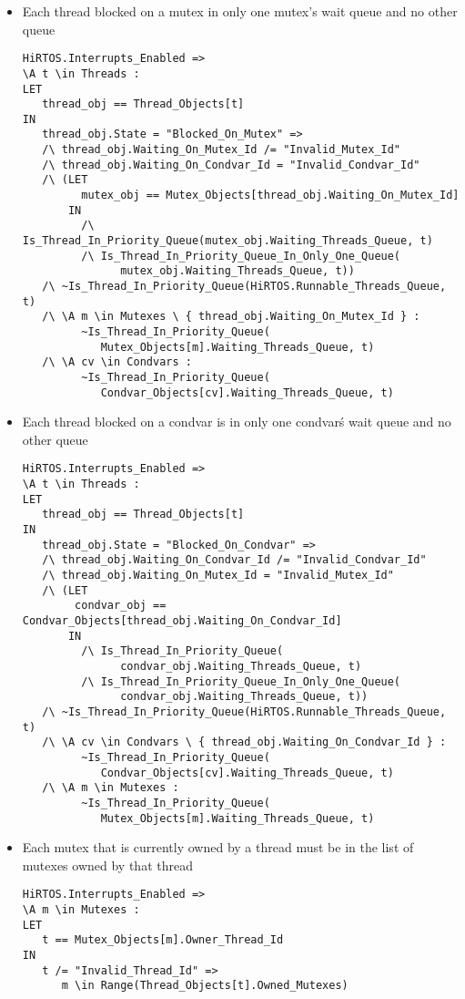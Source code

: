 \documentclass[11pt,letterpaper,twoside,openany]{book}
\begin{document}
\begin{itemize}
\item Each thread blocked on a mutex in only one mutex's wait queue and no other queue
\begin{lstlisting}
HiRTOS.Interrupts_Enabled =>
\A t \in Threads :
LET
   thread_obj == Thread_Objects[t]
IN
   thread_obj.State = "Blocked_On_Mutex" =>
   /\ thread_obj.Waiting_On_Mutex_Id /= "Invalid_Mutex_Id"
   /\ thread_obj.Waiting_On_Condvar_Id = "Invalid_Condvar_Id"
   /\ (LET
         mutex_obj == Mutex_Objects[thread_obj.Waiting_On_Mutex_Id]
       IN
         /\ Is_Thread_In_Priority_Queue(mutex_obj.Waiting_Threads_Queue, t)
         /\ Is_Thread_In_Priority_Queue_In_Only_One_Queue(
               mutex_obj.Waiting_Threads_Queue, t))
   /\ ~Is_Thread_In_Priority_Queue(HiRTOS.Runnable_Threads_Queue, t)
   /\ \A m \in Mutexes \ { thread_obj.Waiting_On_Mutex_Id } :
         ~Is_Thread_In_Priority_Queue(
            Mutex_Objects[m].Waiting_Threads_Queue, t)
   /\ \A cv \in Condvars :
         ~Is_Thread_In_Priority_Queue(
            Condvar_Objects[cv].Waiting_Threads_Queue, t)
\end{lstlisting}

\item Each thread blocked on a condvar is in only one condvar\'s wait queue and no other queue
\begin{lstlisting}
HiRTOS.Interrupts_Enabled =>
\A t \in Threads :
LET
   thread_obj == Thread_Objects[t]
IN
   thread_obj.State = "Blocked_On_Condvar" =>
   /\ thread_obj.Waiting_On_Condvar_Id /= "Invalid_Condvar_Id"
   /\ thread_obj.Waiting_On_Mutex_Id = "Invalid_Mutex_Id"
   /\ (LET
        condvar_obj == Condvar_Objects[thread_obj.Waiting_On_Condvar_Id]
       IN
         /\ Is_Thread_In_Priority_Queue(
               condvar_obj.Waiting_Threads_Queue, t)
         /\ Is_Thread_In_Priority_Queue_In_Only_One_Queue(
               condvar_obj.Waiting_Threads_Queue, t))
   /\ ~Is_Thread_In_Priority_Queue(HiRTOS.Runnable_Threads_Queue, t)
   /\ \A cv \in Condvars \ { thread_obj.Waiting_On_Condvar_Id } :
         ~Is_Thread_In_Priority_Queue(
            Condvar_Objects[cv].Waiting_Threads_Queue, t)
   /\ \A m \in Mutexes :
         ~Is_Thread_In_Priority_Queue(
            Mutex_Objects[m].Waiting_Threads_Queue, t)
\end{lstlisting}

\item Each mutex that is currently owned by a thread must be in the list of mutexes owned by that thread
\begin{lstlisting}
HiRTOS.Interrupts_Enabled =>
\A m \in Mutexes :
LET
   t == Mutex_Objects[m].Owner_Thread_Id
IN
   t /= "Invalid_Thread_Id" =>
      m \in Range(Thread_Objects[t].Owned_Mutexes)
\end{lstlisting}


\end{itemize}
\end{document}
